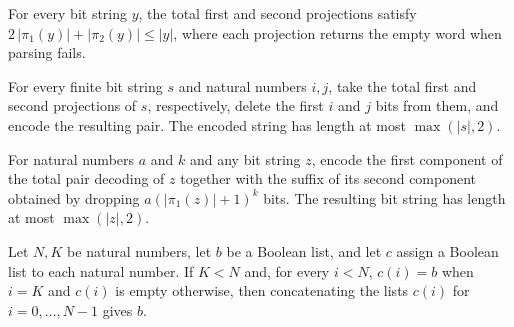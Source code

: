 \begin{theorem}
\label{Complexity.length_pair_components_le}
\leanok
{}
For every bit string $y$, the total first and second projections satisfy
$2\,|\pi_1(y)|+|\pi_2(y)|\le |y|$, where each projection returns the empty word when
parsing fails.
\end{theorem}

\begin{theorem}
\label{Complexity.length_pairEncode_drop_le}
\leanok
{}
For every finite bit string $s$ and natural numbers $i,j$, take the total first and
second projections of $s$, respectively, delete the first $i$ and $j$ bits from them,
and encode the resulting pair. The encoded string has length at most $\max(|s|,2)$.
\end{theorem}

\begin{theorem}
\label{Complexity.length_sliceDropAt_le}
\leanok
{}
For natural numbers $a$ and $k$ and any bit string $z$, encode the first component of
the total pair decoding of $z$ together with the suffix of its second component obtained
by dropping $a(|\pi_1(z)|+1)^k$ bits. The resulting bit string has length at most
$\max(|z|,2)$.
\end{theorem}

\begin{theorem}
\label{Complexity.flatMap_range_eq_single}
\leanok
{}
Let $N,K$ be natural numbers, let $b$ be a Boolean list, and let $c$ assign a Boolean
list to each natural number. If $K<N$ and, for every $i<N$, $c(i)=b$ when $i=K$ and
$c(i)$ is empty otherwise, then concatenating the lists $c(i)$ for $i=0,\ldots,N-1$
gives $b$.
\end{theorem}

